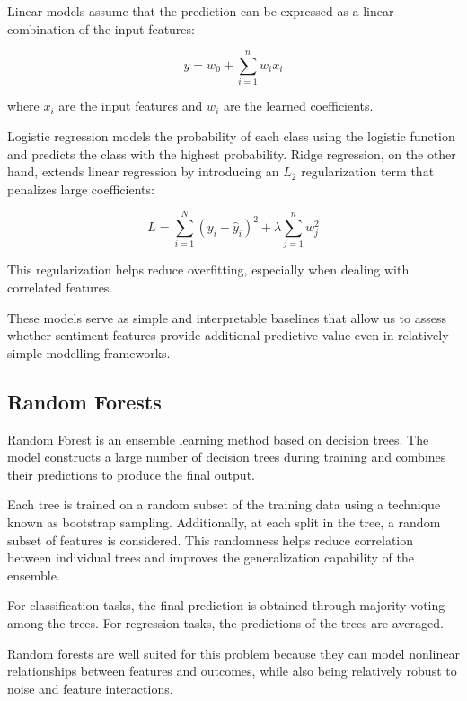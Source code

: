 Linear models assume that the prediction can be expressed as a linear combination of the input features:

\begin{equation}
y = w_0 + \sum_{i=1}^{n} w_i x_i
\end{equation}

where $x_i$ are the input features and $w_i$ are the learned coefficients.

Logistic regression models the probability of each class using the logistic function and predicts the class with the highest probability. Ridge regression, on the other hand, extends linear regression by introducing an $L_2$ regularization term that penalizes large coefficients:

\begin{equation}
L = \sum_{i=1}^{N} (y_i - \hat{y}_i)^2 + \lambda \sum_{j=1}^{n} w_j^2
\end{equation}

This regularization helps reduce overfitting, especially when dealing with correlated features.

These models serve as simple and interpretable baselines that allow us to assess whether sentiment features provide additional predictive value even in relatively simple modelling frameworks.

\subsection{Random Forests}

Random Forest is an ensemble learning method based on decision trees. The model constructs a large number of decision trees during training and combines their predictions to produce the final output.

Each tree is trained on a random subset of the training data using a technique known as bootstrap sampling. Additionally, at each split in the tree, a random subset of features is considered. This randomness helps reduce correlation between individual trees and improves the generalization capability of the ensemble.

For classification tasks, the final prediction is obtained through majority voting among the trees. For regression tasks, the predictions of the trees are averaged.

Random forests are well suited for this problem because they can model nonlinear relationships between features and outcomes, while also being relatively robust to noise and feature interactions.

